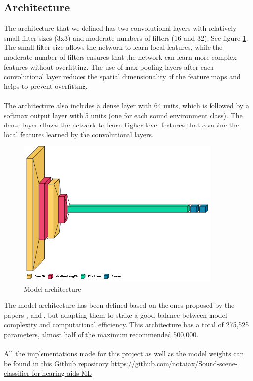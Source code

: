 \documentclass[12pt,oneside,a4paper,english]{article}
\begin{document}
\subsection{Architecture}
The architecture that we defined has two convolutional layers with relatively small filter sizes (3x3) and moderate numbers of filters (16 and 32). See figure  \ref{fig:Model architecture}. The small filter size allows the network to learn local features, while the moderate number of filters ensures that the network can learn more complex features without overfitting. The use of max pooling layers after each convolutional layer reduces the spatial dimensionality of the feature maps and helps to prevent overfitting.
\\
\\
The architecture also includes a dense layer with 64 units, which is followed by a softmax output layer with 5 units (one for each sound environment class). The dense layer allows the network to learn higher-level features that combine the local features learned by the convolutional layers.
\begin{figure}[H]
	\centering
	\includegraphics[width=10cm]{figures/model_architecture.png}
	\caption{Model architecture}
	 \label{fig:Model architecture}
\end{figure}
The model architecture has been defined based on the ones proposed by the papers \cite{piczak2015}, \cite{salamon2017} and \cite{politis2018}, but adapting them to strike a good balance between model complexity and computational efficiency. This architecture has a total of 275,525 parameters, almost half of the maximum recommended 500,000.
\\
\\
All the implementations made for this project as well as the model weights can be found in this Github repository
{\url{https://github.com/notaiax/Sound-scene-classifier-for-hearing-aids-ML}}
\end{document}
